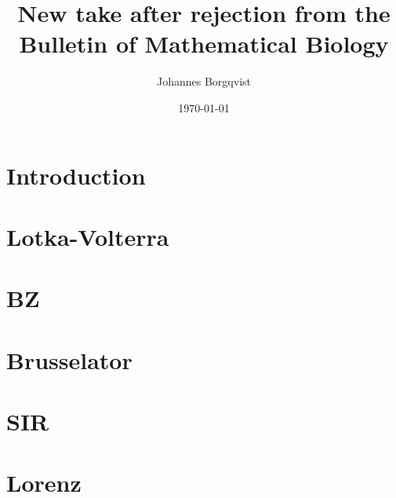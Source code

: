 \documentclass[12pt]{article}
\begin{document}
\title{\textbf{New take after rejection from the Bulletin of Mathematical Biology}}
\author{Johannes Borgqvist}
\date{\today}
\maketitle
\tableofcontents
\clearpage
\section{Introduction}

\section{Lotka-Volterra}

\section{BZ}

\section{Brusselator}

\section{SIR}

\section{Lorenz}

\end{document}

